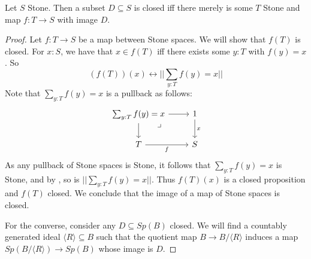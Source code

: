 \begin{lemma}
  Let $S$ Stone. 
  Then a subset $D\subseteq S$ is closed iff there merely is some $T$ Stone 
  and map $f:T\to S$ with image $D$. 
\end{lemma}
\begin{proof}
  Let $f:T\to S$ be a map between Stone spaces. 
  We will show that $f(T)$ is closed. 
  For $x:S$, we have that $x\in f(T)$ iff there exists some $y:T$ 
  with $f(y) = x$. 
  So 
  \begin{equation}
    (f(T))(x) \leftrightarrow || \sum_{y:T} f(y) = x||
  \end{equation}
  Note that $\sum_{y:T} f(y) = x$ is a pullback as follows:
  \begin{equation}
    \begin{tikzcd}
      \sum_{y:T} f(y) = x\arrow[rd,"\lrcorner"{pos=0.125},phantom] \arrow[r] \arrow[d]
      & 1 \arrow[d,"x"] \\
      T \arrow[r,"f"']  & S
    \end{tikzcd}
  \end{equation}
  As any pullback of Stone spaces is Stone, it follows that 
  $\sum_{y:T} f(y) = x$ is Stone, and by , 
  so is $||\sum_{y:T} f(y) = x||$. Thus $f(T)(x)$ is a closed proposition and $f(T)$ closed. 
  We conclude that the image of a map of Stone spaces is closed. 

  For the converse, consider any $D\subseteq Sp(B)$ closed. 
  We will find a countably generated ideal $\langle R \rangle \subseteq B$ such that 
  the quotient map $B \to B /\langle R \rangle$ induces a map 
  $Sp(B/\langle R \rangle) \to Sp(B)$ whose image is $D$. 
\end{proof}



